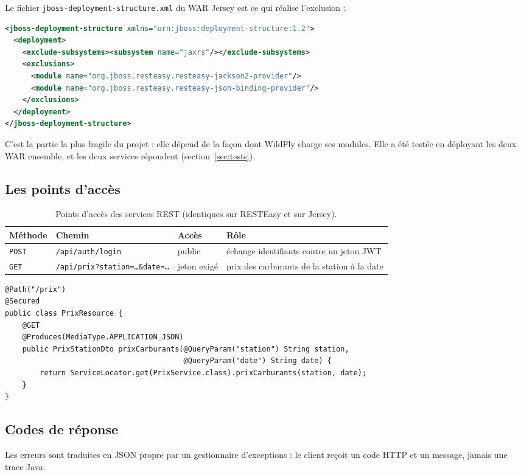 \documentclass[11pt,a4paper]{article}
\newcommand{\code}[1]{\texttt{#1}}
\begin{document}
Le fichier \code{jboss-deployment-structure.xml} du WAR Jersey est ce qui réalise l'exclusion :

\begin{lstlisting}[language=XML]
<jboss-deployment-structure xmlns="urn:jboss:deployment-structure:1.2">
  <deployment>
    <exclude-subsystems><subsystem name="jaxrs"/></exclude-subsystems>
    <exclusions>
      <module name="org.jboss.resteasy.resteasy-jackson2-provider"/>
      <module name="org.jboss.resteasy.resteasy-json-binding-provider"/>
    </exclusions>
  </deployment>
</jboss-deployment-structure>
\end{lstlisting}

C'est la partie la plus fragile du projet : elle dépend de la façon dont WildFly charge ses modules. Elle a été testée en déployant les deux WAR ensemble, et les deux services répondent (section~\ref{sec:tests}).

\subsection{Les points d'accès}
\begin{table}[H]
\centering
\small
\begin{tabular}{@{}lllp{5.4cm}@{}}
\toprule
\textbf{Méthode} & \textbf{Chemin} & \textbf{Accès} & \textbf{Rôle}\\
\midrule
\code{POST} & \code{/api/auth/login} & public & échange identifiants contre un jeton JWT\\
\code{GET} & \code{/api/prix?station=\ldots\&date=\ldots} & jeton exigé & prix des carburants de la station à la date\\
\bottomrule
\end{tabular}
\caption{Points d'accès des services REST (identiques sur RESTEasy et sur Jersey).}
\end{table}

\begin{lstlisting}[language=JavaX]
@Path("/prix")
@Secured
public class PrixResource {
    @GET
    @Produces(MediaType.APPLICATION_JSON)
    public PrixStationDto prixCarburants(@QueryParam("station") String station,
                                         @QueryParam("date") String date) {
        return ServiceLocator.get(PrixService.class).prixCarburants(station, date);
    }
}
\end{lstlisting}

\subsection{Codes de réponse}
Les erreurs sont traduites en JSON propre par un gestionnaire d'exceptions : le client reçoit un code HTTP et un message, jamais une trace Java.
\end{document}
